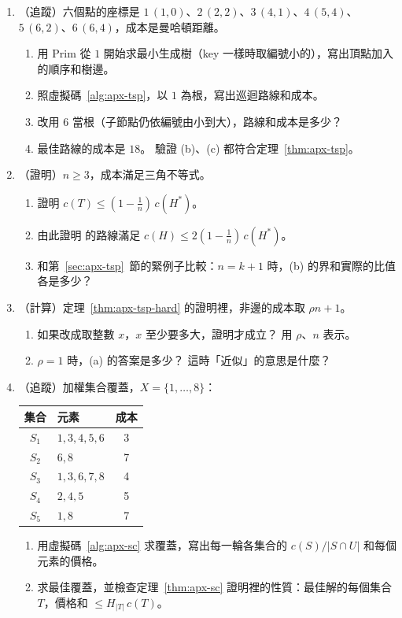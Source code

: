 \begin{enumerate}
\item \label{q:apx-tsp-trace}（追蹤）六個點的座標是 $1\,(1, 0)$、$2\,(2, 2)$、$3\,(4, 1)$、$4\,(5, 4)$、
$5\,(6, 2)$、$6\,(6, 4)$，成本是曼哈頓距離。
\begin{enumerate}
\item 用 Prim 從 $1$ 開始求最小生成樹（key 一樣時取編號小的），寫出頂點加入的順序和樹邊。
\item 照虛擬碼~\ref{alg:apx-tsp}，以 $1$ 為根，寫出巡迴路線和成本。
\item 改用 $6$ 當根（子節點仍依編號由小到大），路線和成本是多少？
\item 最佳路線的成本是 $18$。 驗證 (b)、(c) 都符合定理~\ref{thm:apx-tsp}。
\end{enumerate}

\item \label{q:apx-tsp-better}（證明）$n \ge 3$，成本滿足三角不等式。
\begin{enumerate}
\item 證明 $c(T) \le (1 - \frac1n)\, c(H^*)$。
\item 由此證明  的路線滿足 $c(H) \le 2(1 - \frac1n)\, c(H^*)$。
\item 和第~\ref{sec:apx-tsp}~節的緊例子比較：$n = k + 1$ 時，(b) 的界和實際的比值各是多少？
\end{enumerate}

\item \label{q:apx-gap}（計算）定理~\ref{thm:apx-tsp-hard} 的證明裡，非邊的成本取 $\rho n + 1$。
\begin{enumerate}
\item 如果改成取整數 $x$，$x$ 至少要多大，證明才成立？ 用 $\rho$、$n$ 表示。
\item $\rho = 1$ 時，(a) 的答案是多少？ 這時「近似」的意思是什麼？
\end{enumerate}

\item \label{q:apx-sc-trace}（追蹤）加權集合覆蓋，$X = \{1, \ldots, 8\}$：
\begin{center}
\begin{tabular}{clc}
\toprule
集合 & 元素 & 成本 \\
\midrule
$S_1$ & $1, 3, 4, 5, 6$ & 3 \\
$S_2$ & $6, 8$ & 7 \\
$S_3$ & $1, 3, 6, 7, 8$ & 4 \\
$S_4$ & $2, 4, 5$ & 5 \\
$S_5$ & $1, 8$ & 7 \\
\bottomrule
\end{tabular}
\end{center}
\begin{enumerate}
\item 用虛擬碼~\ref{alg:apx-sc} 求覆蓋，寫出每一輪各集合的 $c(S)/|S \cap U|$ 和每個元素的價格。
\item 求最佳覆蓋，並檢查定理~\ref{thm:apx-sc} 證明裡的性質：最佳解的每個集合 $T$，價格和
$\le H_{|T|}\, c(T)$。
\end{enumerate}


\end{enumerate}
